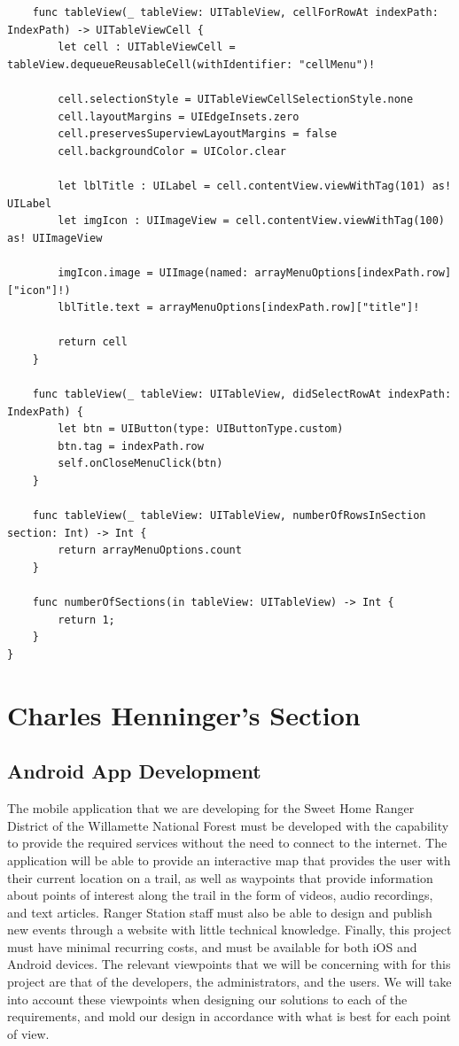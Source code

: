 \documentclass[letterpaper, 10pt,titlepage]{article}
\begin{document}
\begin{verbatim}
    func tableView(_ tableView: UITableView, cellForRowAt indexPath: IndexPath) -> UITableViewCell {
        let cell : UITableViewCell = tableView.dequeueReusableCell(withIdentifier: "cellMenu")!
        
        cell.selectionStyle = UITableViewCellSelectionStyle.none
        cell.layoutMargins = UIEdgeInsets.zero
        cell.preservesSuperviewLayoutMargins = false
        cell.backgroundColor = UIColor.clear
        
        let lblTitle : UILabel = cell.contentView.viewWithTag(101) as! UILabel
        let imgIcon : UIImageView = cell.contentView.viewWithTag(100) as! UIImageView
        
        imgIcon.image = UIImage(named: arrayMenuOptions[indexPath.row]["icon"]!)
        lblTitle.text = arrayMenuOptions[indexPath.row]["title"]!
        
        return cell
    }
    
    func tableView(_ tableView: UITableView, didSelectRowAt indexPath: IndexPath) {
        let btn = UIButton(type: UIButtonType.custom)
        btn.tag = indexPath.row
        self.onCloseMenuClick(btn)
    }
    
    func tableView(_ tableView: UITableView, numberOfRowsInSection section: Int) -> Int {
        return arrayMenuOptions.count
    }
    
    func numberOfSections(in tableView: UITableView) -> Int {
        return 1;
    }
}

\end{verbatim}


\vspace{0.5cm}


\section{Charles Henninger's Section}
\subsection{Android App Development}
The mobile application that we are developing for the Sweet Home Ranger District of the Willamette National Forest must be developed with the capability to provide the required services without the need to connect to the internet. The application will be able to provide an interactive map that provides the user with their current location on a trail, as well as waypoints that provide information about points of interest along the trail in the form of videos, audio recordings, and text articles. Ranger Station staff must also be able to design and publish new events through a website with little technical knowledge. Finally, this project must have minimal recurring costs, and must be available for both iOS and Android devices. The relevant viewpoints that we will be concerning with for this project are that of the developers, the administrators, and the users. We will take into account these viewpoints when designing our solutions to each of the requirements, and mold our design in accordance with what is best for each point of view. 
\end{document}
